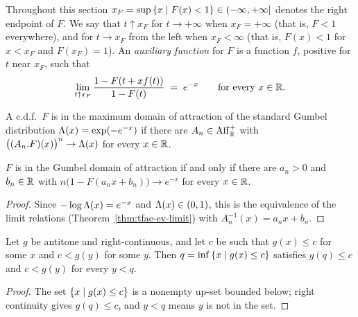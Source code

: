 Throughout this section $x_F = \sup \left\{  x \; | \; F(x) < 1  \right\} \in (-\infty, +\infty]$ denotes
the right endpoint of $F$. We say that \emph{$t \uparrow x_F$} for $t \to +\infty$ when
$x_F = +\infty$ (that is, $F < 1$ everywhere), and for $t \to x_F$ from the left when
$x_F < \infty$ (that is, $F(x) < 1$ for $x < x_F$ and $F(x_F) = 1$). An \emph{auxiliary function}
for $F$ is a function $f$, positive for $t$ near $x_F$, such that
\begin{align*}
  \lim_{t \uparrow x_F} \frac{1 - F(t + x f(t))}{1 - F(t)} \; = \; e^{-x}
  \qquad \text{for every } x \in \mathbb{R} .
\end{align*}

\begin{definition}
  \label{def:mda-gumbel}
  \leanok
  A c.d.f.\ $F$ is in the maximum domain of attraction of the standard Gumbel distribution
  $\Lambda(x) = \exp(-e^{-x})$ if there are $A_n \in \mathrm{Aff}^+_{\mathbb{R}}$ with
  $\big( (A_n . F)(x) \big)^n \to \Lambda(x)$ for every $x \in \mathbb{R}$.
\end{definition}

\begin{lemma}
  \label{lem:mda-gumbel-of-tendsto-mul}
  \leanok
  $F$ is in the Gumbel domain of attraction if and only if there are $a_n > 0$ and $b_n \in \mathbb{R}$
  with $n \big( 1 - F(a_n x + b_n) \big) \to e^{-x}$ for every $x \in \mathbb{R}$.
\end{lemma}
\begin{proof}
  \leanok
  Since $-\log \Lambda(x) = e^{-x}$ and $\Lambda(x) \in (0, 1)$, this is the equivalence of
  the limit relations (Theorem~\ref{thm:tfae-ev-limit}) with $A_n^{-1}(x) = a_n x + b_n$.
\end{proof}

\begin{lemma}
  \label{lem:gumbel-quantile}
  \leanok
  Let $g$ be antitone and right-continuous, and let $c$ be such that $g(x) \le c$ for some $x$
  and $c < g(y)$ for some $y$. Then $q = \inf \left\{  x \; | \; g(x) \le c  \right\}$ satisfies
  $g(q) \le c$ and $c < g(y)$ for every $y < q$.
\end{lemma}
\begin{proof}
  \leanok
  The set $\left\{  x \; | \; g(x) \le c  \right\}$ is a nonempty up-set bounded below; right continuity
  gives $g(q) \le c$, and $y < q$ means $y$ is not in the set.
\end{proof}

